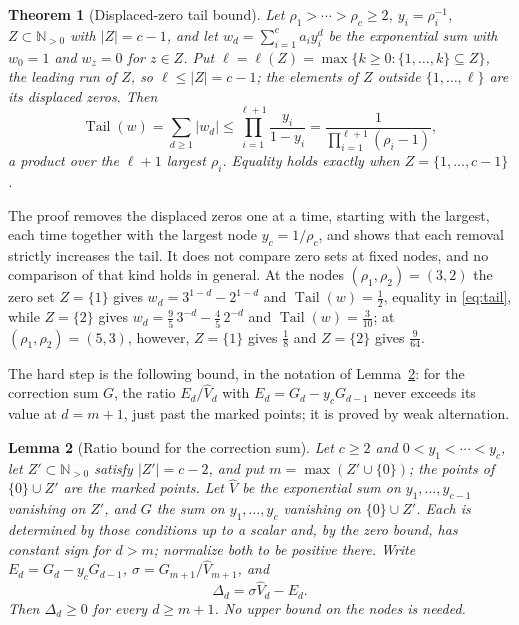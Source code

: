\documentclass[11pt]{article}
\newtheorem{theorem}{Theorem}[section]
\newtheorem{lemma}[theorem]{Lemma}
\newcommand{\N}{\mathbb N}
\DeclareMathOperator{\Tail}{Tail}
\begin{document}
\begin{theorem}[Displaced-zero tail bound]\label{thm:tail}
Let $\rho_1>\cdots>\rho_c\ge2$, $y_i=\rho_i^{-1}$, $Z\subset\N_{>0}$ with
$|Z|=c-1$, and let $w_d=\sum_{i=1}^ca_iy_i^d$ be the exponential sum
with $w_0=1$ and $w_z=0$ for $z\in Z$.  Put
$\ell=\ell(Z)=\max\{k\ge0:\{1,\ldots,k\}\subseteq Z\}$, the leading run of
$Z$, so $\ell\le|Z|=c-1$; the elements of $Z$ outside $\{1,\ldots,\ell\}$ are its displaced zeros.
Then
\begin{equation}\label{eq:tail}
  \Tail(w)=\sum_{d\ge1}|w_d|
  \le \prod_{i=1}^{\ell+1}\frac{y_i}{1-y_i}
  =\frac{1}{\prod_{i=1}^{\ell+1}(\rho_i-1)},
\end{equation}
a product over the $\ell+1$ largest $\rho_i$.  Equality holds exactly when $Z=\{1,\ldots,c-1\}$.
\end{theorem}

The proof removes the displaced zeros one at a time, starting with the
largest, each time together with the largest node $y_c=1/\rho_c$, and shows
that each removal strictly increases the tail.  It does not compare zero
sets at fixed nodes, and no comparison of that kind holds in general.  At the nodes
$(\rho_1,\rho_2)=(3,2)$ the zero set $Z=\{1\}$
gives $w_d=3^{1-d}-2^{1-d}$ and $\Tail(w)=\frac12$, equality in
\eqref{eq:tail}, while $Z=\{2\}$ gives $w_d=\frac95\,3^{-d}-\frac45\,2^{-d}$
and $\Tail(w)=\frac3{10}$; at $(\rho_1,\rho_2)=(5,3)$, however, $Z=\{1\}$
gives $\frac18$ and $Z=\{2\}$ gives $\frac9{64}$.

The hard step is the following bound, in the notation of
Lemma~\ref{lem:interlace}: for the correction sum $G$, the ratio $E_d/\widehat V_d$ with $E_d=G_d-y_cG_{d-1}$
never exceeds its value at $d=m+1$, just past the marked points; it is
proved by weak alternation.

\begin{lemma}[Ratio bound for the correction sum]\label{lem:interlace}
Let $c\ge2$ and $0<y_1<\cdots<y_c$, let $Z'\subset\N_{>0}$ satisfy $|Z'|=c-2$, and put
$m=\max(Z'\cup\{0\})$; the points of $\{0\}\cup Z'$ are the marked
points.  Let $\widehat V$ be the exponential sum on
$y_1,\ldots,y_{c-1}$ vanishing on $Z'$, and $G$ the sum on
$y_1,\ldots,y_c$ vanishing on $\{0\}\cup Z'$.  Each is determined by those
conditions up to a scalar and, by the zero bound, has constant sign for
$d>m$; normalize both to be positive there.  Write $E_d=G_d-y_cG_{d-1}$,
$\sigma=G_{m+1}/\widehat V_{m+1}$, and
\[
  \Delta_d=\sigma\widehat V_d-E_d.
\]
Then $\Delta_d\ge0$ for every $d\ge m+1$.  No upper bound on the nodes is
needed.
\end{lemma}
\end{document}
